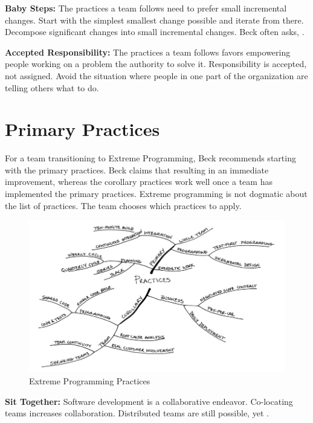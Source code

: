 \textbf{Baby Steps:} The practices a team follows need to prefer small incremental changes. Start with the simplest smallest change possible and iterate from there. Decompose significant changes into small incremental changes. Beck often asks,  \cite{BeckExtremeProgramming2004}. 


\textbf{Accepted Responsibility:} The practices a team follows favors empowering people working on a problem the authority to solve it. Responsibility is accepted, not assigned. Avoid the situation where people in one part of the organization are telling others what to do. 


\section{Primary Practices}
For a team transitioning to Extreme Programming, Beck recommends starting with the primary practices. Beck claims that  resulting in an immediate improvement, whereas the corollary practices work well once a team has implemented the primary practices. Extreme programming is not dogmatic about the list of practices. The team chooses which practices to apply.


\begin{figure}[t]
\centering
\includegraphics[width=\twoColumnWidth{}]{extreme_programming_images/summary_of_practices.png}
\caption{Extreme Programming Practices \cite{BeckExtremeProgramming2004}}
\label{XPSummaryOfPractices}
\end{figure}


\textbf{Sit Together:} Software development is a collaborative endeavor. Co-locating teams increases collaboration. Distributed teams are still possible, yet   \cite{BeckExtremeProgramming2004}. 


